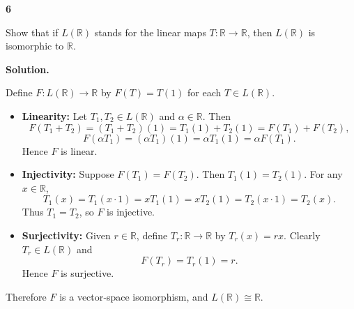 \documentclass[11pt]{article}
\newcommand{\ProblemDivider}[1]{%
  \vspace{1.0em}
  \noindent\textbf{#1}\par
  \vspace{0.35em}
}
\newcommand{\ProblemAnnounce}{\noindent}
\newcommand{\SolutionAnnounce}{\noindent\textbf{Solution.}\par\medskip}
\newcommand{\R}{\mathbb{R}}
\begin{document}
\ProblemDivider{6}

\begin{problemBox}
\ProblemAnnounce
Show that if \(L(\R)\) stands for the linear maps \(T:\R \to \R\), then \(L(\R)\) is isomorphic to \(\R\).
\end{problemBox}

\begin{solutionBox}
\SolutionAnnounce
\doublespacing

Define \(F : L(\R) \to \R\) by \(F(T) = T(1)\) for each \(T \in L(\R)\).

\begin{itemize}
  \item \textbf{Linearity:}  
  Let \(T_1, T_2 \in L(\R)\) and \(\alpha \in \R\). Then
  \[
  F(T_1 + T_2) = (T_1 + T_2)(1) = T_1(1) + T_2(1) = F(T_1) + F(T_2),
  \]
  \[
  F(\alpha T_1) = (\alpha T_1)(1) = \alpha T_1(1) = \alpha F(T_1).
  \]
  Hence \(F\) is linear.

  \item \textbf{Injectivity:}  
  Suppose \(F(T_1) = F(T_2)\). Then \(T_1(1) = T_2(1)\). For any \(x \in \R\),
  \[
  T_1(x) = T_1(x \cdot 1) = x T_1(1) = x T_2(1) = T_2(x \cdot 1) = T_2(x).
  \]
  Thus \(T_1 = T_2\), so \(F\) is injective.

  \item \textbf{Surjectivity:}  
  Given \(r \in \R\), define \(T_r : \R \to \R\) by \(T_r(x) = r x\). Clearly \(T_r \in L(\R)\) and
  \[
  F(T_r) = T_r(1) = r.
  \]
  Hence \(F\) is surjective.
\end{itemize}

Therefore \(F\) is a vector‑space isomorphism, and \(L(\R) \cong \R\).

\end{solutionBox}
\end{document}
